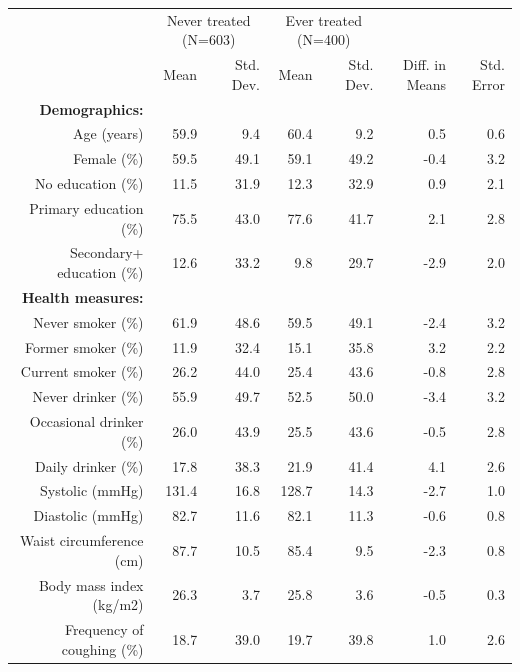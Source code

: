 \documentclass[
  letterpaper,
  DIV=11,
  numbers=noendperiod]{scrartcl}
\makeatletter
\renewenvironment{table}%
  {\renewcommand\familydefault\sfdefault
   \@float{table}}
  {\end@float}
\makeatother
\begin{document}
\hypertarget{tbl-table1}{}
\begin{table}
\caption{\label{tbl-table1}Descriptive statistics for selected demographic, health, and
environmental measures at baseline, by treatment status }\tabularnewline

\centering\centering
\fontsize{9}{11}\selectfont
\begin{tabular}[t]{rrrrrrr}
\toprule
\multicolumn{1}{c}{ } & \multicolumn{2}{c}{Never treated (N=603)} & \multicolumn{2}{c}{Ever treated (N=400)} & \multicolumn{2}{c}{ } \\
\cmidrule(l{3pt}r{3pt}){2-3} \cmidrule(l{3pt}r{3pt}){4-5}
  & Mean & Std. Dev. & Mean & Std. Dev. & Diff. in Means & Std. Error\\
\midrule
\textbf{Demographics:} & \textbf{} & \textbf{} & \textbf{} & \textbf{} & \textbf{} & \textbf{}\\
Age (years) & 59.9 & 9.4 & 60.4 & 9.2 & 0.5 & 0.6\\
Female (\%) & 59.5 & 49.1 & 59.1 & 49.2 & -0.4 & 3.2\\
No education (\%) & 11.5 & 31.9 & 12.3 & 32.9 & 0.9 & 2.1\\
Primary education (\%) & 75.5 & 43.0 & 77.6 & 41.7 & 2.1 & 2.8\\
Secondary+ education (\%) & 12.6 & 33.2 & 9.8 & 29.7 & -2.9 & 2.0\\
\textbf{Health measures:} & \textbf{} & \textbf{} & \textbf{} & \textbf{} & \textbf{} & \textbf{}\\
Never smoker (\%) & 61.9 & 48.6 & 59.5 & 49.1 & -2.4 & 3.2\\
Former smoker (\%) & 11.9 & 32.4 & 15.1 & 35.8 & 3.2 & 2.2\\
Current smoker (\%) & 26.2 & 44.0 & 25.4 & 43.6 & -0.8 & 2.8\\
Never drinker (\%) & 55.9 & 49.7 & 52.5 & 50.0 & -3.4 & 3.2\\
Occasional drinker (\%) & 26.0 & 43.9 & 25.5 & 43.6 & -0.5 & 2.8\\
Daily drinker (\%) & 17.8 & 38.3 & 21.9 & 41.4 & 4.1 & 2.6\\
Systolic (mmHg) & 131.4 & 16.8 & 128.7 & 14.3 & -2.7 & 1.0\\
Diastolic (mmHg) & 82.7 & 11.6 & 82.1 & 11.3 & -0.6 & 0.8\\
Waist circumference (cm) & 87.7 & 10.5 & 85.4 & 9.5 & -2.3 & 0.8\\
Body mass index (kg/m2) & 26.3 & 3.7 & 25.8 & 3.6 & -0.5 & 0.3\\
Frequency of coughing (\%) & 18.7 & 39.0 & 19.7 & 39.8 & 1.0 & 2.6\\

\end{tabular}
\end{table}
\end{document}
